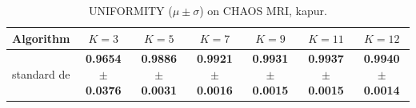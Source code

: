 \begin{table}[htbp]
\centering
\caption{UNIFORMITY ($\mu \pm \sigma$) on CHAOS MRI, kapur.}
\label{tab:exp2-kapur-uniformity}
\begin{tabular}{lcccccc}
\toprule
Algorithm & $K=3$ & $K=5$ & $K=7$ & $K=9$ & $K=11$ & $K=12$ \\
\midrule
standard de & \textbf{0.9654 $\pm$ 0.0376} & \textbf{0.9886 $\pm$ 0.0031} & \textbf{0.9921 $\pm$ 0.0016} & \textbf{0.9931 $\pm$ 0.0015} & \textbf{0.9937 $\pm$ 0.0015} & \textbf{0.9940 $\pm$ 0.0014} \\
\bottomrule
\end{tabular}
\end{table}